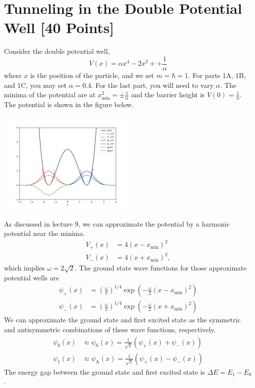 \newpage
\section{Tunneling in the Double Potential Well [40 Points]}

Consider the double potential well,
\begin{equation}
  V(x) =  \alpha x^4  - 2x^2 + + \frac{1}{\alpha}
\end{equation}
where $x$ is the position of the particle, and we set $m=\hbar=1$.
For parts 1A, 1B, and 1C, you may set $\alpha = 0.4$.
For the last part, you will need to vary $\alpha$.
The minima of the potential are at $x_\mathrm{min}^2 = \pm\frac{1}{\alpha}$ and the barrier height is $V(0) = \frac{1}{\alpha}$.
The potential is shown in the figure below.
\begin{center}
  \includegraphics[width=0.5\textwidth]{V_all.pdf}
\end{center}

As discussed in lecture 9, we can approximate the potential by a harmonic potential near the minima.
\begin{align}
  V_+(x) & = 4(x-x_\mathrm{min})^2  \\
  V_-(x) & = 4(x+x_\mathrm{min})^2,
\end{align}
which implies $\omega = 2\sqrt{2}$.
The ground state wave functions for those approximate potential wells are
\begin{align}
  \psi_+(x) & = \left(\frac{\omega}{\pi}\right)^{1/4} \exp\left(- \frac{\omega}{2}(x-x_\mathrm{min})^2\right) \\
  \psi_-(x) & = \left(\frac{\omega}{\pi}\right)^{1/4} \exp\left(- \frac{\omega}{2}(x+x_\mathrm{min})^2\right)
\end{align}
We can approximate the ground state and first excited state as the symmetric and antisymmetric combinations of these wave functions, respectively.
\begin{align}
  \psi_0(x) & \approx \psi_\mathrm{S}(x) = \frac{1}{\sqrt{2}}\left ( \psi_+(x) + \psi_-(x) \right ) \\
  \psi_1(x) & \approx \psi_\mathrm{A}(x) = \frac{1}{\sqrt{2}}\left ( \psi_+(x) - \psi_-(x) \right )
\end{align}
The energy gap between the ground state and first excited state is $\Delta E = E_1 - E_0$.

